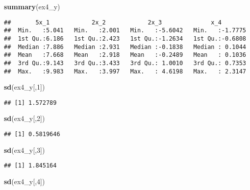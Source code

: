 \documentclass[
]{article}
\newenvironment{Shaded}{\begin{snugshade}}{\end{snugshade}}
\newcommand{\DecValTok}[1]{\textcolor[rgb]{0.00,0.00,0.81}{#1}}
\newcommand{\KeywordTok}[1]{\textcolor[rgb]{0.13,0.29,0.53}{\textbf{#1}}}
\newcommand{\NormalTok}[1]{#1}
\begin{document}
\begin{Shaded}
\begin{Highlighting}[]
\KeywordTok{summary}\NormalTok{(ex4\_y)}
\end{Highlighting}
\end{Shaded}

\begin{verbatim}
##       5x_1            2x_2            2x_3              x_4         
##  Min.   :5.041   Min.   :2.001   Min.   :-5.6042   Min.   :-1.7775  
##  1st Qu.:6.186   1st Qu.:2.423   1st Qu.:-1.2634   1st Qu.:-0.6808  
##  Median :7.886   Median :2.931   Median :-0.1838   Median : 0.1044  
##  Mean   :7.668   Mean   :2.918   Mean   :-0.2489   Mean   : 0.1036  
##  3rd Qu.:9.143   3rd Qu.:3.433   3rd Qu.: 1.0010   3rd Qu.: 0.7353  
##  Max.   :9.983   Max.   :3.997   Max.   : 4.6198   Max.   : 2.3147
\end{verbatim}

\begin{Shaded}
\begin{Highlighting}[]
\KeywordTok{sd}\NormalTok{(ex4\_y[,}\DecValTok{1}\NormalTok{])}
\end{Highlighting}
\end{Shaded}

\begin{verbatim}
## [1] 1.572789
\end{verbatim}

\begin{Shaded}
\begin{Highlighting}[]
\KeywordTok{sd}\NormalTok{(ex4\_y[,}\DecValTok{2}\NormalTok{])}
\end{Highlighting}
\end{Shaded}

\begin{verbatim}
## [1] 0.5819646
\end{verbatim}

\begin{Shaded}
\begin{Highlighting}[]
\KeywordTok{sd}\NormalTok{(ex4\_y[,}\DecValTok{3}\NormalTok{])}
\end{Highlighting}
\end{Shaded}

\begin{verbatim}
## [1] 1.845164
\end{verbatim}

\begin{Shaded}
\begin{Highlighting}[]
\KeywordTok{sd}\NormalTok{(ex4\_y[,}\DecValTok{4}\NormalTok{])}
\end{Highlighting}
\end{Shaded}
\end{document}
